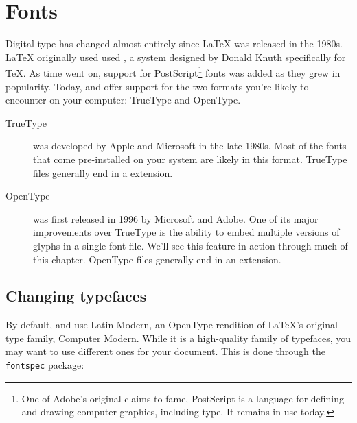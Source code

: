 \chapter{Fonts}
\label{fonts}

Digital type has changed almost entirely since \LaTeX{} was released in the
1980s.
\LaTeX{} originally used used \MF, a system designed by Donald Knuth specifically
for \TeX{}.
As time went on, support for PostScript\footnote{One of
Adobe's original claims to fame,
PostScript is a language for defining and drawing computer graphics,
including type. It remains in use today.} fonts was added
as they grew in popularity.
Today, \LuaLaTeX{} and \XeLaTeX{} offer support for the two formats you're
likely to encounter on your computer:
TrueType and OpenType.

\begin{description}
\item[TrueType] was developed by Apple and Microsoft in the late 1980s.
    Most of the fonts that come pre-installed on your system are likely
    in this format.
    TrueType files generally end in a  extension.
\item[OpenType] was first released in 1996 by Microsoft and Adobe.
    One of its major improvements over TrueType is the ability to embed
    multiple versions of glyphs in a single font file.
    We'll see this feature in action through much of this chapter.
    OpenType files generally end in an  extension.
\end{description}

\section{Changing typefaces}

By default, \LuaLaTeX{} and \XeLaTeX{} use Latin Modern,
an OpenType rendition of \LaTeX's original type family, Computer Modern.
While it is a high-quality family of typefaces,
you may want to use different ones for your document.
This is done through the \texttt{fontspec} package:

